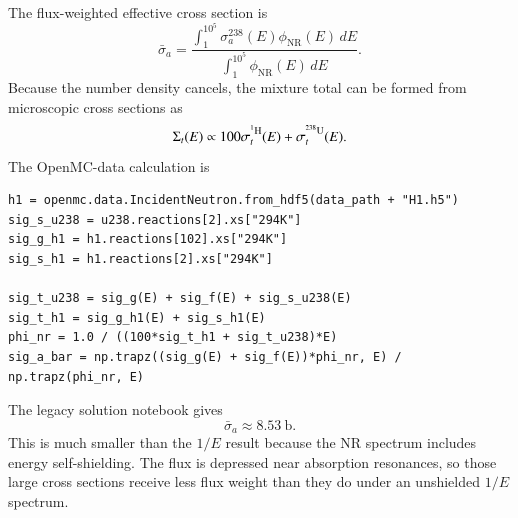 \begin{adaptedsolution}
The flux-weighted effective cross section is
\[
 \bar{\sigma}_a
 =\frac{\int_1^{10^5}\sigma_a^{238}(E)\phi_{\mathrm{NR}}(E)\,dE}
        {\int_1^{10^5}\phi_{\mathrm{NR}}(E)\,dE}.
\]
Because the  number density cancels, the mixture total can be
formed from microscopic cross sections as
\[
 \Sigma_t(E)\propto
 100\sigma_t^{\isoA{H}{1}}(E)+\sigma_t^{\isoA{U}{238}}(E).
\]
The OpenMC-data calculation is
\begin{verbatim}
h1 = openmc.data.IncidentNeutron.from_hdf5(data_path + "H1.h5")
sig_s_u238 = u238.reactions[2].xs["294K"]
sig_g_h1 = h1.reactions[102].xs["294K"]
sig_s_h1 = h1.reactions[2].xs["294K"]

sig_t_u238 = sig_g(E) + sig_f(E) + sig_s_u238(E)
sig_t_h1 = sig_g_h1(E) + sig_s_h1(E)
phi_nr = 1.0 / ((100*sig_t_h1 + sig_t_u238)*E)
sig_a_bar = np.trapz((sig_g(E) + sig_f(E))*phi_nr, E) / np.trapz(phi_nr, E)
\end{verbatim}
The legacy solution notebook gives
\[
 \boxed{\bar{\sigma}_a\approx8.53~\mathrm b}.
\]
This is much smaller than the $1/E$ result because the NR spectrum includes
energy self-shielding.  The flux is depressed near  absorption
resonances, so those large cross sections receive less flux weight than they
do under an unshielded $1/E$ spectrum.
\end{adaptedsolution}

\clearpage
